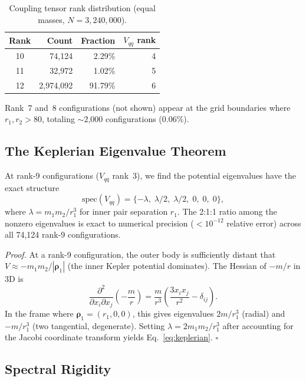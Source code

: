 \documentclass[aps,pre,twocolumn,superscriptaddress,floatfix]{revtex4-2}
\begin{document}
\begin{table}[h]
\caption{Coupling tensor rank distribution (equal masses, $N = 3{,}240{,}000$).}
\label{tab:landscape}
\begin{ruledtabular}
\begin{tabular}{crrr}
Rank & Count & Fraction & $V_{qq}$ rank \\
\hline
10 & 74{,}124 & 2.29\% & 4 \\
11 & 32{,}972 & 1.02\% & 5 \\
12 & 2{,}974{,}092 & 91.79\% & 6 \\
\end{tabular}
\end{ruledtabular}
\end{table}

Rank~7 and~8 configurations (not shown) appear at the grid boundaries
where $r_1, r_2 > 80$, totaling $\sim$2{,}000 configurations (0.06\%).

\subsection{The Keplerian Eigenvalue Theorem}

At rank-9 configurations ($V_{qq}$ rank~3), we find the potential
eigenvalues have the exact structure
\begin{equation}
\text{spec}(V_{qq}) = \{-\lambda,\; \lambda/2,\; \lambda/2,\; 0,\; 0,\; 0\},
\label{eq:keplerian}
\end{equation}
where $\lambda = m_1 m_2 / r_1^3$ for inner pair separation $r_1$.
The 2:1:1 ratio among the nonzero eigenvalues is exact to numerical
precision ($< 10^{-12}$ relative error) across all 74{,}124 rank-9
configurations.

\emph{Proof.} At a rank-9 configuration, the outer body is sufficiently
distant that $V \approx -m_1 m_2 / |\boldsymbol{\rho}_1|$ (the inner
Kepler potential dominates). The Hessian of $-m/r$ in 3D is
\begin{equation}
\frac{\partial^2}{\partial x_i \partial x_j}\left(-\frac{m}{r}\right)
= \frac{m}{r^3}\left(\frac{3 x_i x_j}{r^2} - \delta_{ij}\right).
\end{equation}
In the frame where $\boldsymbol{\rho}_1 = (r_1, 0, 0)$, this gives
eigenvalues $2m/r_1^3$ (radial) and $-m/r_1^3$ (two tangential,
degenerate). Setting $\lambda = 2m_1 m_2 / r_1^3$ after accounting
for the Jacobi coordinate transform yields
Eq.~\eqref{eq:keplerian}. $\square$

\subsection{Spectral Rigidity}
\end{document}
